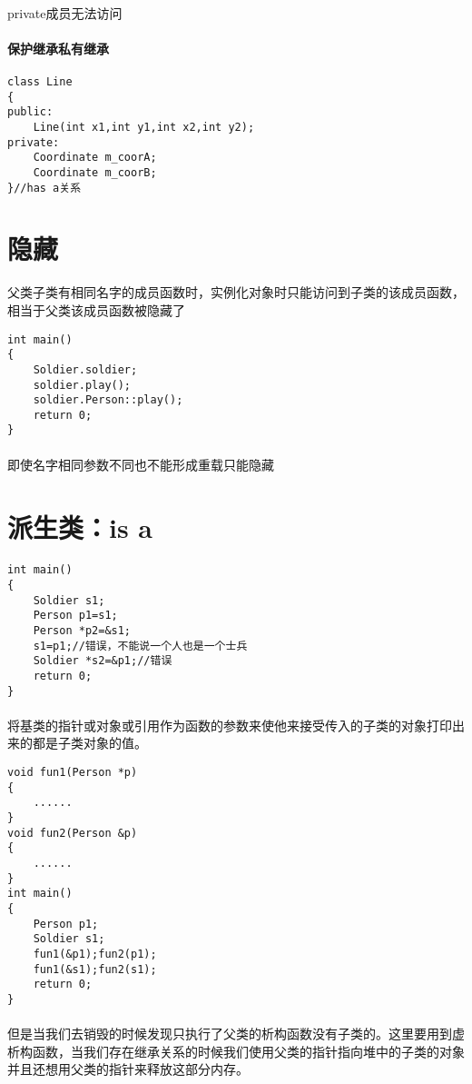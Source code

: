 \documentclass{article}
\begin{document}
\begin{CJK}{UTF8}{gbsn}
\paragraph{}
private成员无法访问
\paragraph{保护继承私有继承}
\begin{verbatim}
class Line
{
public:
	Line(int x1,int y1,int x2,int y2);
private:
	Coordinate m_coorA;
	Coordinate m_coorB;
}//has a关系
\end{verbatim}   
\section{隐藏}
父类子类有相同名字的成员函数时，实例化对象时只能访问到子类的该成员函数，相当于父类该成员函数被隐藏了 
\begin{verbatim}
int main()
{
	Soldier.soldier;
	soldier.play();
	soldier.Person::play();
	return 0;
}
\end{verbatim}
\paragraph{}
即使名字相同参数不同也不能形成重载只能隐藏
\section{派生类：is a}
\paragraph{}
\begin{verbatim}
int main()
{
	Soldier s1;
	Person p1=s1;
	Person *p2=&s1;
	s1=p1;//错误，不能说一个人也是一个士兵
	Soldier *s2=&p1;//错误
	return 0;
}
\end{verbatim}
\paragraph{}
将基类的指针或对象或引用作为函数的参数来使他来接受传入的子类的对象打印出来的都是子类对象的值。
\begin{verbatim}
void fun1(Person *p)
{
	......
}
void fun2(Person &p)
{
	......
}
int main()
{
	Person p1;
	Soldier s1;
	fun1(&p1);fun2(p1);
	fun1(&s1);fun2(s1);
	return 0;
}
\end{verbatim}
\paragraph{}
但是当我们去销毁的时候发现只执行了父类的析构函数没有子类的。这里要用到虚析构函数，当我们存在继承关系的时候我们使用父类的指针指向堆中的子类的对象并且还想用父类的指针来释放这部分内存。

\end{CJK}
\end{document}
